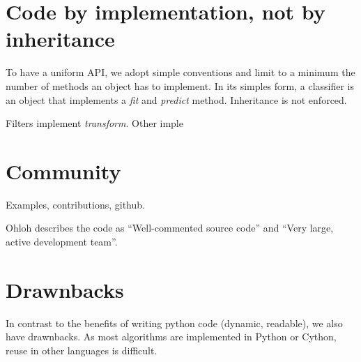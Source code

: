 \documentclass[twoside,11pt]{article}
\begin{document}
\section{Code by implementation, not by inheritance}

To have a uniform API, we adopt simple conventions and limit to a
minimum the number of methods an object has to implement. In its
simples form, a classifier is an object that implements a \emph{fit}
and \emph{predict} method. Inheritance is not enforced.

Filters implement \emph{transform}. Other imple

\section{Community}

Examples, contributions, github.

Ohloh describes the code as ``Well-commented source code'' and ``Very
large, active development team''.

\section{Drawnbacks}
In contrast to the benefits of writing python code (dynamic,
readable), we also have drawnbacks. As most algorithms are implemented
in Python or Cython, reuse in other languages is difficult.
\end{document}
